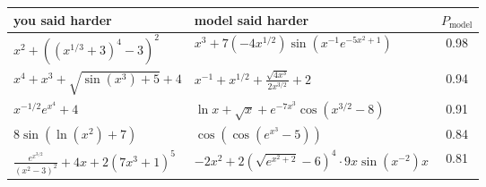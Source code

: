{\renewcommand{\arraystretch}{1.7}\begin{tabular}{llc}
\toprule
you said harder & model said harder & $P_{\text{model}}$ \\
\midrule
$\displaystyle x^{2} + \left(\left(x^{1/3} + 3\right)^{4} - 3\right)^{2}$ & $\displaystyle x^{3} + 7 \left(-4 x^{1/2}\right) \sin\left(x^{-1} e^{-5 x^{2} + 1}\right)$ & 0.98 \\
$\displaystyle x^{4} + x^{3} + \sqrt{\sin\left(x^{3}\right) + 5} + 4$ & $\displaystyle x^{-1} + x^{1/2} + \frac{\sqrt{4 x^{3}}}{2 x^{3/2}} + 2$ & 0.94 \\
$\displaystyle x^{-1/2} e^{x^{4}} + 4$ & $\displaystyle \ln x + \sqrt{x} + e^{-7 x^{3}} \cos\left(x^{3/2} - 8\right)$ & 0.91 \\
$\displaystyle 8 \sin\left(\ln\left(x^{2}\right) + 7\right)$ & $\displaystyle \cos\left(\cos\left(e^{x^{3}} - 5\right)\right)$ & 0.84 \\
$\displaystyle \frac{e^{x^{3/2}}}{\left(x^{2} - 3\right)^{2}} + 4 x + 2 \left(7 x^{3} + 1\right)^{5}$ & $\displaystyle -2 x^{2} + 2 \left(\sqrt{e^{x^{2} + 2}} - 6\right)^{4} \cdot 9 x \sin\left(x^{-2}\right) x$ & 0.81 \\
\bottomrule
\end{tabular}}
